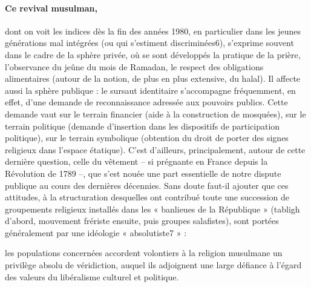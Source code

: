 \paragraph{Ce revival musulman, }
dont on voit les indices dès la fin des années 1980, en particulier dans les jeunes générations mal intégrées (ou qui s’estiment discriminées6), s’exprime souvent dans le cadre de la sphère privée, où se sont développés la pratique de la prière, l’observance du jeûne du mois de Ramadan, le respect des obligations alimentaires (autour de la notion, de plus en plus extensive, du halal). Il affecte aussi la sphère publique : le sursaut identitaire s’accompagne fréquemment, en effet, d’une demande de reconnaissance adressée aux pouvoirs publics. Cette demande vaut sur le terrain financier (aide à la construction de mosquées), sur le terrain politique (demande d’insertion dans les dispositifs de participation politique), sur le terrain symbolique (obtention du droit de porter des signes religieux dans l’espace étatique). C’est d’ailleurs, principalement, autour de cette dernière question, celle du vêtement – si prégnante en France depuis la Révolution de 1789 –, que s’est nouée une part essentielle de notre dispute publique au cours des dernières décennies. Sans doute faut-il ajouter que ces attitudes, à la structuration desquelles ont contribué toute une succession de groupements religieux installés dans les « banlieues de la République » (tabligh d’abord, mouvement frériste ensuite, puis groupes salafistes), sont portées généralement par une idéologie « absolutiste7 » : 
\begin{Def}
les populations concernées accordent volontiers à la religion musulmane un privilège absolu de véridiction, auquel ils adjoignent une large défiance à l’égard des valeurs du libéralisme culturel et politique.

\end{Def}

